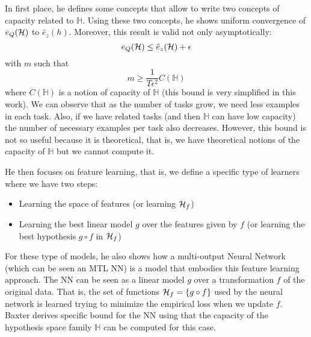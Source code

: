 

In first place, he defines some concepts that allow to write two concepts of capacity related to $\mathbb{H}$. Using these two concepts, he shows uniform convergence of $e_Q(\mathcal{H})$ to $\hat{e}_z(h)$. Moreover, this result is valid not only asymptotically:
\begin{equation*}
    e_Q(\mathcal{H}) \leq \hat{e}_z(\mathcal{H}) + \epsilon
\end{equation*}
with $m$ such that
\begin{equation*}
    m \geq \frac{1}{T \epsilon^2} C(\mathbb{H})
\end{equation*}
where $C(\mathbb{H})$ is a notion of capacity of $\mathbb{H}$ (this bound is very simplified in this work). We can observe that as the number of tasks grow, we need less examples in each task. Also, if we have related tasks (and then $\mathbb{H}$ can have low capacity) the number of necessary examples per task also decreases.
However, this bound is not so useful because it is theoretical, that is, we have theoretical notions of the capacity of $\mathbb{H}$ but we cannot compute it.

He then focuses on feature learning, that is, we define a specific type of learners where we have two steps:
\begin{itemize}
    \item Learning the space of features (or learning $\mathcal{H}_f$)
    \item Learning the best linear model $g$ over the features given by $f$ (or learning the best hypothesis $g \circ f$ in $\mathcal{H}_f$)
\end{itemize}
For these type of models, he also shows how a multi-output Neural Network (which can be seen an MTL NN) is a model that embodies this feature learning approach.
The NN can be seen as a linear model $g$ over a transformation $f$ of the original data. That is, the set of functions $\mathcal{H}_f = \{g \circ f \}$ used by the neural network is learned trying to minimize the empirical loss when we update $f$.
Baxter derives specific bound for the NN using that the capacity of the hypothesis space family $\mathbb{H}$ can be computed for this case.

